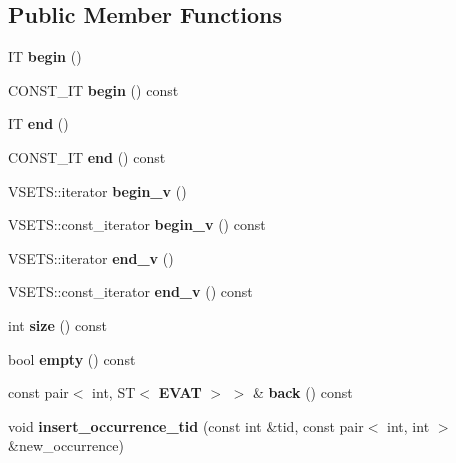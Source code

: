 \subsection*{Public Member Functions}
\begin{CompactItemize}
\item 
IT {\bf begin} ()\label{classvat_3_01GRAPH__PROP_00_01V__Fk1__MINE__PROP_00_01ST_01_4_a0}

\item 
CONST\_\-IT {\bf begin} () const \label{classvat_3_01GRAPH__PROP_00_01V__Fk1__MINE__PROP_00_01ST_01_4_a1}

\item 
IT {\bf end} ()\label{classvat_3_01GRAPH__PROP_00_01V__Fk1__MINE__PROP_00_01ST_01_4_a2}

\item 
CONST\_\-IT {\bf end} () const \label{classvat_3_01GRAPH__PROP_00_01V__Fk1__MINE__PROP_00_01ST_01_4_a3}

\item 
VSETS::iterator {\bf begin\_\-v} ()\label{classvat_3_01GRAPH__PROP_00_01V__Fk1__MINE__PROP_00_01ST_01_4_a4}

\item 
VSETS::const\_\-iterator {\bf begin\_\-v} () const \label{classvat_3_01GRAPH__PROP_00_01V__Fk1__MINE__PROP_00_01ST_01_4_a5}

\item 
VSETS::iterator {\bf end\_\-v} ()\label{classvat_3_01GRAPH__PROP_00_01V__Fk1__MINE__PROP_00_01ST_01_4_a6}

\item 
VSETS::const\_\-iterator {\bf end\_\-v} () const \label{classvat_3_01GRAPH__PROP_00_01V__Fk1__MINE__PROP_00_01ST_01_4_a7}

\item 
int {\bf size} () const \label{classvat_3_01GRAPH__PROP_00_01V__Fk1__MINE__PROP_00_01ST_01_4_a8}

\item 
bool {\bf empty} () const \label{classvat_3_01GRAPH__PROP_00_01V__Fk1__MINE__PROP_00_01ST_01_4_a9}

\item 
const  pair$<$ int, ST$<$ {\bf EVAT} $>$ $>$ \& {\bf back} () const \label{classvat_3_01GRAPH__PROP_00_01V__Fk1__MINE__PROP_00_01ST_01_4_a10}

\item 
void {\bf insert\_\-occurrence\_\-tid} (const  int \&tid, const  pair$<$ int, int $>$ \&new\_\-occurrence)\label{classvat_3_01GRAPH__PROP_00_01V__Fk1__MINE__PROP_00_01ST_01_4_a11}


\end{CompactItemize}
